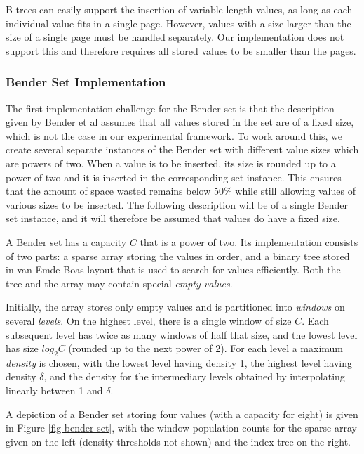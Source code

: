 \documentclass{acm_proc_article-sp}
\begin{document}
B-trees can easily support the insertion of variable-length values, as long
as each individual value fits in a single page. However, values with
a size larger than the size of a single page must be handled separately.
Our implementation does not support this and therefore requires all
stored values to be smaller than the pages.

\subsubsection{Bender Set Implementation}
\label{sect-bender-set}
The first implementation challenge for the Bender set is that the description
given by Bender et al assumes that all values stored in the set are of a
fixed size, which is not the case in our experimental framework. To work
around this, we create several separate instances of the Bender set with
different value sizes which are powers of two. When a value is to be inserted,
its size is rounded up to a power of two and it is inserted in the
corresponding set instance. This ensures that the amount of space wasted
remains below 50\% while still allowing values of various sizes to be inserted.
The following description will be of a single Bender set instance, and it will
therefore be assumed that values do have a fixed size.

A Bender set has a capacity $C$ that is a power of two. Its implementation
consists of two parts: a sparse array storing the values in order, and a binary
tree stored in van Emde Boas layout that is used to search for values
efficiently.
Both the tree and the array may contain special \emph{empty values}.

Initially, the array stores only empty values and is partitioned into
\emph{windows} on several \emph{levels}.
On the highest level, there is a single window of size $C$. Each subsequent level
has twice as many windows of half that size, and the lowest level has size
$log_2 C$ (rounded up to the next power of 2).
For each level a maximum \emph{density} is chosen, with the lowest level having
density 1, the highest level having density $\delta$, and the density for
the intermediary levels obtained by interpolating linearly between 1 and
$\delta$.

A depiction of a Bender set storing four values (with a capacity for eight) is
given in Figure \ref{fig-bender-set}, with the window population counts for
the sparse array given on the left (density thresholds not shown) and the index
tree on the right.
\end{document}
